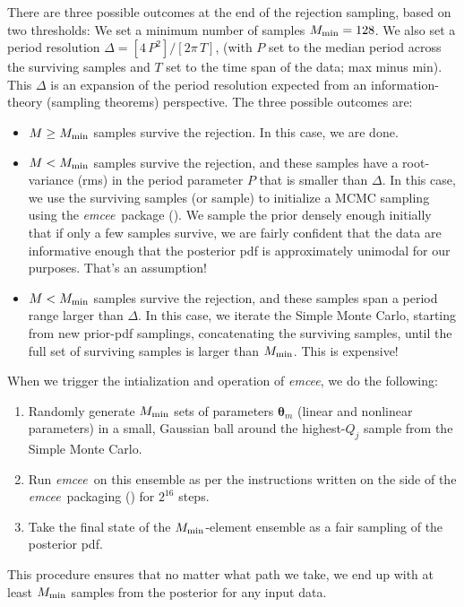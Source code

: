 \documentclass[manuscript, letterpaper]{aastex6}
\newcommand{\project}[1]{\textsl{#1}}
\newcommand{\emcee}{\project{emcee}}
\newcommand{\bs}[1]{\boldsymbol{#1}}
\begin{document}
There are three possible outcomes at the end of the rejection
sampling, based on two thresholds:
We set a minimum number of samples $M_{\rm min}=128$.
We also set a period resolution $\Delta = [4\,P^2] / [2\pi\,T]$, (with
$P$ set to the median period across the surviving samples and $T$ set to
the time span of the data; max minus min).
This $\Delta$ is an expansion of the period
resolution expected from an information-theory (sampling theorems) perspective.
The three possible outcomes are:
\begin{itemize}\itemsep0ex
\item $M\geq M_{\rm min}$ samples survive the rejection.
  In this case, we are done.
\item $M<M_{\rm min}$ samples survive the rejection, and these samples
  have a root-variance (rms) in the period parameter $P$ that is
  smaller than $\Delta$.
  In this case, we use the surviving samples (or sample) to
  initialize a MCMC sampling using the \emcee\ package
  (\citealt{Foreman-Mackey:2013}).
  We sample the
  prior densely enough initially that if only a few samples survive,
  we are fairly confident that the data are informative enough that
  the posterior pdf is approximately unimodal for our purposes. That's
  an assumption!
\item $M<M_{\rm min}$ samples survive the rejection, and these samples
  span a period range larger than $\Delta$.
  In this case, we iterate the Simple
  Monte Carlo, starting from new prior-pdf samplings, concatenating
  the surviving samples, until the full set of surviving samples is
  larger than $M_{\rm min}$. This is expensive!
\end{itemize}
When we trigger the intialization and operation of \emcee, we do the following:
\begin{enumerate}\itemsep0ex
\item Randomly generate $M_{\rm min}$ sets of parameters $\bs{\theta}_m$
  (linear and nonlinear parameters) in a small, Gaussian ball around
  the highest-$Q_j$ sample from the Simple Monte Carlo.
\item Run \emcee\ on this ensemble as per the instructions written on the side
  of the \emcee\ packaging (\citealt{Foreman-Mackey:2013}) for $2^{16}$ steps.
\item Take the final state of the $M_{\rm min}$-element ensemble as a
  fair sampling of the posterior pdf.
\end{enumerate}
This procedure ensures that no matter what path we take, we end up with
at least $M_{\rm min}$ samples from the posterior for any input data.
\end{document}
